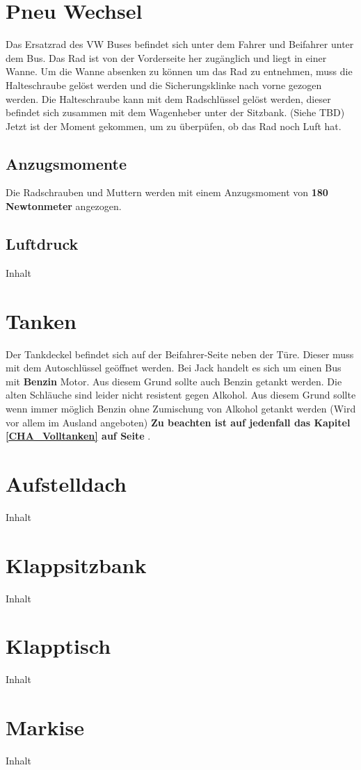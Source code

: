 \section{Pneu Wechsel}
Das Ersatzrad des VW Buses befindet sich unter dem Fahrer und Beifahrer unter dem Bus. 
Das Rad ist von der Vorderseite her zugänglich und liegt in einer Wanne.
Um die Wanne absenken zu können um das Rad zu entnehmen, muss die Halteschraube gelöst werden und die Sicherungsklinke nach vorne gezogen werden. 
Die Halteschraube kann mit dem Radschlüssel gelöst werden, dieser befindet sich zusammen mit dem Wagenheber unter der Sitzbank. (Siehe TBD)
Jetzt ist der Moment gekommen, um zu überpüfen, ob das Rad noch Luft hat.

\subsection{Anzugsmomente}
Die Radschrauben und Muttern werden mit einem Anzugsmoment von \textbf{180 Newtonmeter} angezogen.
\subsection{Luftdruck}
Inhalt
\section{Tanken}
Der Tankdeckel befindet sich auf der Beifahrer-Seite neben der Türe.
Dieser muss mit dem Autoschlüssel geöffnet werden.
Bei Jack handelt es sich um einen Bus mit \textbf{Benzin} Motor.
Aus diesem Grund sollte auch Benzin getankt werden.
Die alten Schläuche sind leider nicht resistent gegen Alkohol.
Aus diesem Grund sollte wenn immer möglich Benzin ohne Zumischung von Alkohol getankt werden (Wird vor allem im Ausland angeboten)
\textbf{Zu beachten ist auf jedenfall das Kapitel \ref {CHA_Volltanken}  auf Seite \pageref{CHA_Volltanken}}
.
\section{Aufstelldach}
Inhalt
\section{Klappsitzbank}
Inhalt
\section{Klapptisch}
Inhalt
\section{Markise}
Inhalt


